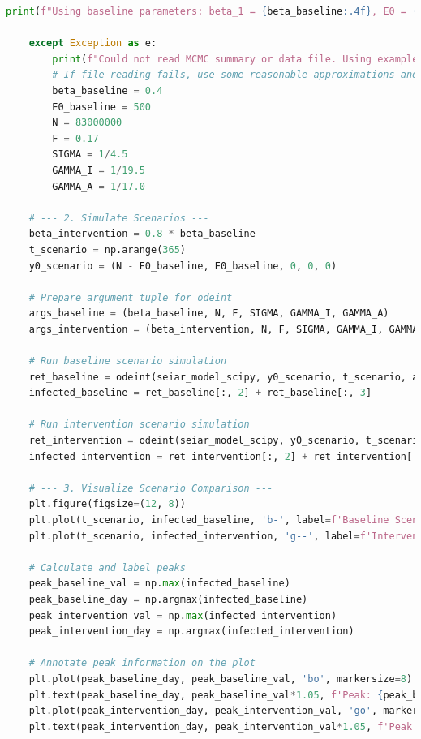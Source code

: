\documentclass[12pt, a4paper]{article}
\begin{document}
\begin{lstlisting}[language=Python, caption=Python script for plotting the Bayesian model fit and running the scenario analysis.]
        print(f"Using baseline parameters: beta_1 = {beta_baseline:.4f}, E0 = {E0_baseline:.2f}")

    except Exception as e:
        print(f"Could not read MCMC summary or data file. Using example values. Error: {e}")
        # If file reading fails, use some reasonable approximations and default values
        beta_baseline = 0.4 
        E0_baseline = 500
        N = 83000000
        F = 0.17
        SIGMA = 1/4.5
        GAMMA_I = 1/19.5
        GAMMA_A = 1/17.0

    # --- 2. Simulate Scenarios ---
    beta_intervention = 0.8 * beta_baseline
    t_scenario = np.arange(365) 
    y0_scenario = (N - E0_baseline, E0_baseline, 0, 0, 0)

    # Prepare argument tuple for odeint
    args_baseline = (beta_baseline, N, F, SIGMA, GAMMA_I, GAMMA_A)
    args_intervention = (beta_intervention, N, F, SIGMA, GAMMA_I, GAMMA_A)

    # Run baseline scenario simulation
    ret_baseline = odeint(seiar_model_scipy, y0_scenario, t_scenario, args=args_baseline)
    infected_baseline = ret_baseline[:, 2] + ret_baseline[:, 3]

    # Run intervention scenario simulation
    ret_intervention = odeint(seiar_model_scipy, y0_scenario, t_scenario, args=args_intervention)
    infected_intervention = ret_intervention[:, 2] + ret_intervention[:, 3]

    # --- 3. Visualize Scenario Comparison ---
    plt.figure(figsize=(12, 8))
    plt.plot(t_scenario, infected_baseline, 'b-', label=f'Baseline Scenario (β = {beta_baseline:.3f})', linewidth=2)
    plt.plot(t_scenario, infected_intervention, 'g--', label=f'Intervention Scenario (β reduced by 20%)', linewidth=2)

    # Calculate and label peaks
    peak_baseline_val = np.max(infected_baseline)
    peak_baseline_day = np.argmax(infected_baseline)
    peak_intervention_val = np.max(infected_intervention)
    peak_intervention_day = np.argmax(infected_intervention)

    # Annotate peak information on the plot
    plt.plot(peak_baseline_day, peak_baseline_val, 'bo', markersize=8)
    plt.text(peak_baseline_day, peak_baseline_val*1.05, f'Peak: {peak_baseline_val:,.0f} cases\non Day {peak_baseline_day}', color='b', ha='center')
    plt.plot(peak_intervention_day, peak_intervention_val, 'go', markersize=8)
    plt.text(peak_intervention_day, peak_intervention_val*1.05, f'Peak: {peak_intervention_val:,.0f} cases\non Day {peak_intervention_day}', color='g', ha='center')


\end{lstlisting}
\end{document}
